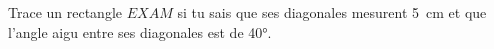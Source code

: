 %
%
    Trace un rectangle \(EXAM\) si tu sais que ses diagonales mesurent \SI{5}{cm} et que l’angle aigu entre ses diagonales est de \ang{40}.
